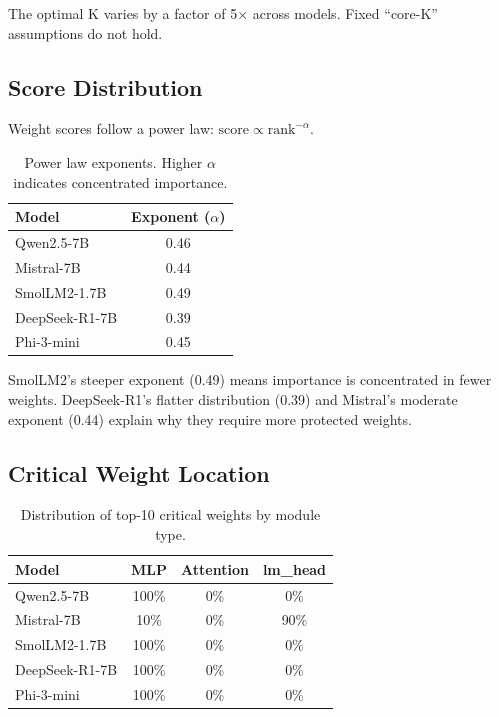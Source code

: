 \documentclass{article}
\begin{document}
The optimal K varies by a factor of 5$\times$ across models. Fixed ``core-K'' assumptions do not hold.

\subsection{Score Distribution}

Weight scores follow a power law: $\text{score} \propto \text{rank}^{-\alpha}$.

\begin{table}[H]
\centering
\caption{Power law exponents. Higher $\alpha$ indicates concentrated importance.}
\begin{tabular}{lc}
\toprule
\textbf{Model} & \textbf{Exponent ($\alpha$)} \\
\midrule
Qwen2.5-7B & 0.46 \\
Mistral-7B & 0.44 \\
SmolLM2-1.7B & 0.49 \\
DeepSeek-R1-7B & 0.39 \\
Phi-3-mini & 0.45 \\
\bottomrule
\end{tabular}
\label{tab:power}
\end{table}

SmolLM2's steeper exponent (0.49) means importance is concentrated in fewer weights. DeepSeek-R1's flatter distribution (0.39) and Mistral's moderate exponent (0.44) explain why they require more protected weights.

\subsection{Critical Weight Location}

\begin{table}[H]
\centering
\caption{Distribution of top-10 critical weights by module type.}
\begin{tabular}{lccc}
\toprule
\textbf{Model} & \textbf{MLP} & \textbf{Attention} & \textbf{lm\_head} \\
\midrule
Qwen2.5-7B & 100\% & 0\% & 0\% \\
Mistral-7B & 10\% & 0\% & 90\% \\
SmolLM2-1.7B & 100\% & 0\% & 0\% \\
DeepSeek-R1-7B & 100\% & 0\% & 0\% \\
Phi-3-mini & 100\% & 0\% & 0\% \\
\bottomrule
\end{tabular}
\label{tab:location}
\end{table}
\end{document}
